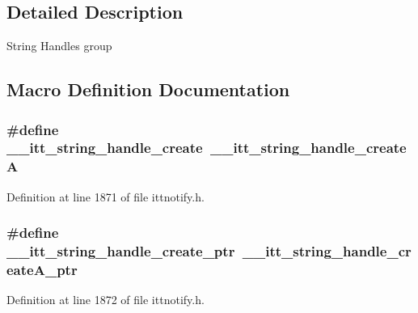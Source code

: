 \subsection{Detailed Description}
String Handles group 

\subsection{Macro Definition Documentation}
\hypertarget{group__handless_ga0a723522866c77dbe13ace2d32ee429c}{
\subsubsection[{\-\_\-\-\_\-itt\-\_\-string\-\_\-handle\-\_\-create}]{\setlength{\rightskip}{0pt plus 5cm}\#define \-\_\-\-\_\-itt\-\_\-string\-\_\-handle\-\_\-create~{\bf \-\_\-\-\_\-itt\-\_\-string\-\_\-handle\-\_\-create\-A}}}\label{group__handless_ga0a723522866c77dbe13ace2d32ee429c}


Definition at line 1871 of file ittnotify.\-h.

\hypertarget{group__handless_ga4af0e0826a5b33bf0d9ed25746419936}{
\subsubsection[{\-\_\-\-\_\-itt\-\_\-string\-\_\-handle\-\_\-create\-\_\-ptr}]{\setlength{\rightskip}{0pt plus 5cm}\#define \-\_\-\-\_\-itt\-\_\-string\-\_\-handle\-\_\-create\-\_\-ptr~\-\_\-\-\_\-itt\-\_\-string\-\_\-handle\-\_\-create\-A\-\_\-ptr}}\label{group__handless_ga4af0e0826a5b33bf0d9ed25746419936}


Definition at line 1872 of file ittnotify.\-h.



